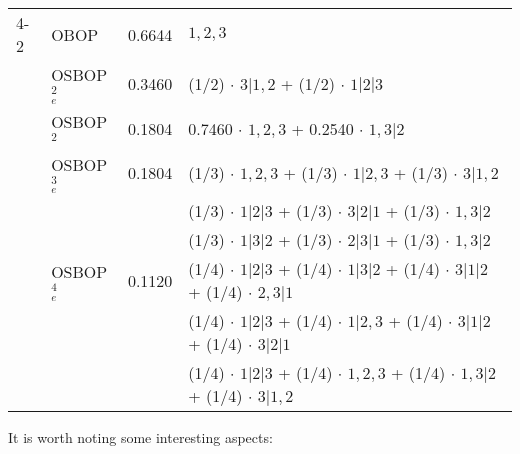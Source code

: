 \documentclass[preprint,12pt]{article}
\theoremstyle{definition}
\theoremstyle{remark}
\theoremstyle{example} %
\begin{document}
\begin{table}
\begin{footnotesize}
\begin{tabular}{llcl}
    \\ \hline     
4-2	&	OBOP        &   0.6644  & $1,2,3$	\\  \cline{2-4}
    &   OSBOP$^2_e$ &   0.3460  & (1/2) $\cdot$ $3|1,2$ + (1/2) $\cdot$ $1|2|3$ \\ \cline{2-4}
    &   OSBOP$^2$   &   0.1804  & 0.7460 $\cdot$ $1,2,3$ + 0.2540 $\cdot$ $1,3|2$   \\ \cline{2-4}
    &   OSBOP$^3_e$ &   0.1804  & (1/3) $\cdot$ $1,2,3$ + (1/3) $\cdot$ $1|2,3$ + (1/3) $\cdot$ $3|1,2$ \\ \cline{4-4}
    &               &           & (1/3) $\cdot$ $1|2|3$ + (1/3) $\cdot$ $3|2|1$ + (1/3) $\cdot$ $1,3|2$ \\ \cline{4-4}
    &               &           & (1/3) $\cdot$ $1|3|2$ + (1/3) $\cdot$ $2|3|1$ + (1/3) $\cdot$ $1,3|2$ 
  \\ \cline{2-4}
    &   OSBOP$^4_e$ &    0.1120  & 
    (1/4) $\cdot$ $1|2|3$ + 
    (1/4) $\cdot$ $1|3|2$ + 
    (1/4) $\cdot$ $3|1|2$ + 
    (1/4) $\cdot$ $2,3|1$  \\ 
    \cline{4-4}
    &               &           & 
    (1/4) $\cdot$ $1|2|3$ + 
    (1/4) $\cdot$ $1|2,3$ + 
    (1/4) $\cdot$ $3|1|2$ + 
    (1/4) $\cdot$ $3|2|1$ 
     \\  \cline{4-4}
    &               &           & 
    (1/4) $\cdot$ $1|2|3$ + 
    (1/4) $\cdot$ $1,2,3$ + 
    (1/4) $\cdot$ $1,3|2$ + 
    (1/4) $\cdot$ $3|1,2$     
    \\ \hline

\end{tabular}
\end{footnotesize}
\end{table}




It is worth noting some interesting aspects:
\end{document}
